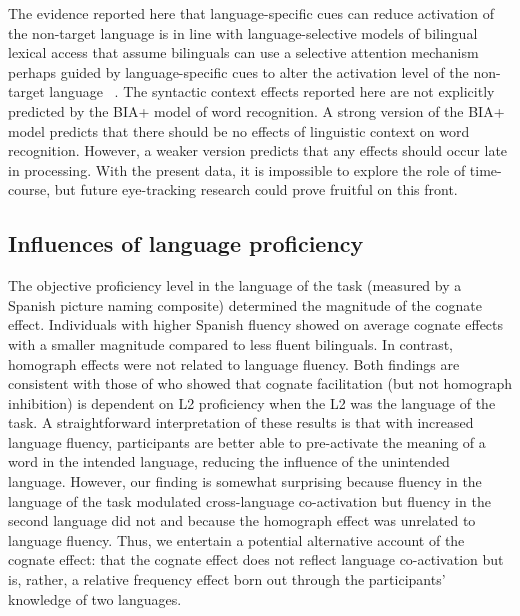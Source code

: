 The evidence reported here that language-specific cues can reduce activation of the non-target language is in line with language-selective models of bilingual lexical access that assume bilinguals can use a selective attention mechanism perhaps guided by language-specific cues to alter the activation level of the non-target language ~\citep{Costa1999, Finkbeiner2006, LaHeij2005}. The syntactic context effects reported here are not explicitly predicted by the BIA+ model of word recognition. A strong version of the BIA+ model predicts that there should be no effects of linguistic context on word recognition. However, a weaker version predicts that any effects should occur late in processing. With the present data, it is impossible to explore the role of time-course, but future eye-tracking research could prove fruitful on this front. 

\subsection{Influences of language proficiency}
\label{influencesoflanguageproficiency}

The objective proficiency level in the language of the task (measured by a Spanish picture naming composite) determined the magnitude of the cognate effect. Individuals with higher Spanish fluency showed on average cognate effects with a smaller magnitude compared to less fluent bilinguals. In contrast, homograph effects were not related to language fluency. Both findings are consistent with those of  \citet{Pivneva2014} who showed that cognate facilitation (but not homograph inhibition) is dependent on L2 proficiency when the L2 was the language of the task. A straightforward interpretation of these results is that with increased language fluency, participants are better able to pre-activate the meaning of a word in the intended language, reducing the influence of the unintended language. However, our finding is somewhat surprising because fluency in the language of the task modulated cross-language co-activation but fluency in the second language did not and because the homograph effect was unrelated to language fluency. Thus, we entertain a potential alternative account of the cognate effect: that the cognate effect does not reflect language co-activation but is, rather, a relative frequency effect born out through the participants' knowledge of two languages. 


